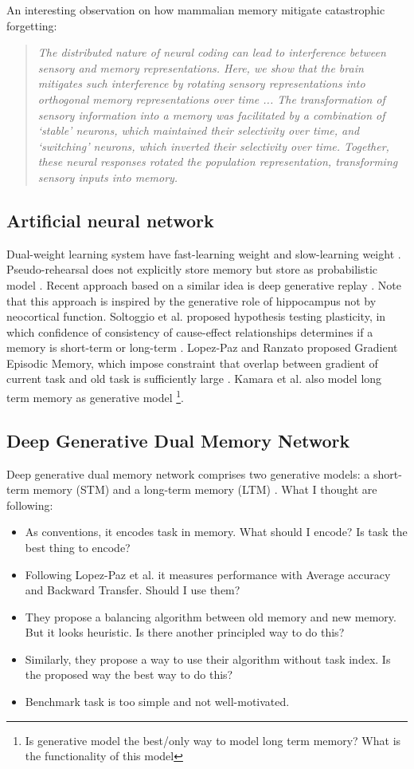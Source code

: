\documentclass[12pt]{article}
\begin{document}
An interesting observation on how mammalian memory mitigate catastrophic 
forgetting:
\begin{quote}
    \textit{The distributed nature of neural coding can lead to interference between sensory and memory representations. 
    Here, we show that the brain mitigates such interference by rotating sensory representations into 
    orthogonal memory representations over time ... 
    The transformation of sensory information into a memory was facilitated by a combination of ‘stable’ neurons, 
    which maintained their selectivity over time, and ‘switching’ neurons, which inverted their selectivity over time. 
    Together, these neural responses rotated the population representation, transforming sensory inputs into memory.
    }\cite{Libby21}
\end{quote}

\subsection{Artificial neural network}
Dual-weight learning system have fast-learning weight and slow-learning weight \cite{Hinton87}. Pseudo-rehearsal 
does not explicitly store memory but store as probabilistic model \cite{Robins95}. Recent approach based on 
a similar idea is deep generative replay \cite{Shin17}. Note that this approach is inspired by the 
generative role of hippocampus not by neocortical function. Soltoggio et al. 
proposed hypothesis testing plasticity, in which confidence of consistency of cause-effect relationships 
determines if a memory is short-term or long-term \cite{Soltoggio15}. Lopez-Paz and Ranzato proposed 
Gradient Episodic Memory, which impose constraint that overlap between gradient of current task and 
old task is sufficiently large \cite{Lopez17}. Kamara et al. also model long term memory 
as generative model \cite{Kemker17,Kemker18} 
\footnote{Is generative model the best/only way to model long term memory? What is the functionality 
of this model}.

\subsection{Deep Generative Dual Memory Network}
Deep generative dual memory network comprises two generative models: 
a short-term memory (STM) and a long-term memory (LTM) \cite{Kamra17}. What I thought are 
following:
\begin{itemize}
    \item As conventions, it encodes task in memory. What should I encode? Is task the best thing to encode?
    \item Following Lopez-Paz et al. it measures performance with Average accuracy and Backward Transfer. Should I use them?
    \item They propose a balancing algorithm between old memory and new memory. But it looks heuristic. Is there another principled way to do this?
    \item Similarly, they propose a way to use their algorithm without task index. Is the proposed way the best way to do this?
    \item Benchmark task is too simple and not well-motivated. 
\end{itemize}
\end{document}
